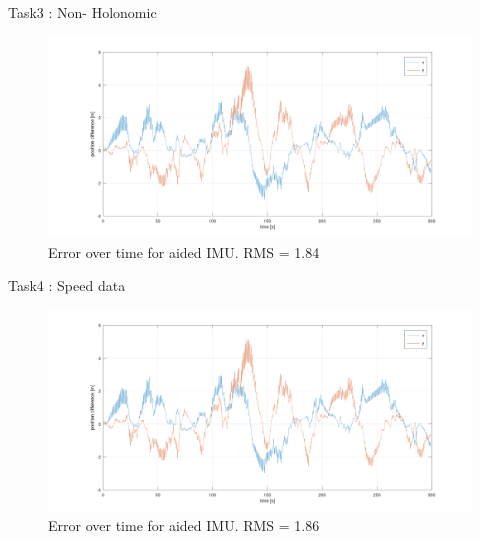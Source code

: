 \documentclass[10pt]{beamer}
\theoremstyle{definition}
\begin{document}
\begin{frame}{Task3 : Non- Holonomic}
\begin{figure}

    \includegraphics[width=\textwidth]{images/holo.png}
    \caption{Error over time for aided IMU. RMS = 1.84}
    
\end{figure}
\end{frame}
\begin{frame}{Task4 : Speed data}
    \begin{figure}

    \includegraphics[width=\textwidth]{images/speed.png}
    \caption{Error over time for aided IMU. RMS = 1.86}
    
\end{figure}
\end{frame}



% 
% 
\end{document}
